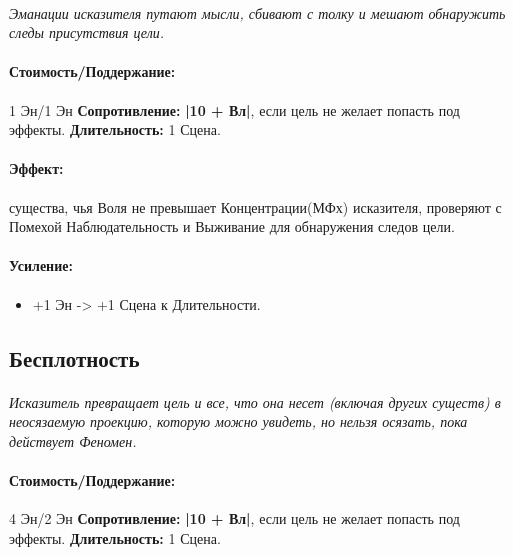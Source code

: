 \paragraph{} 
\textit{Эманации исказителя путают мысли, сбивают с толку и мешают обнаружить следы присутствия цели.}
\paragraph{Стоимость/Поддержание: }1 Эн/1 Эн
\newline
\textbf{Сопротивление: }
\textbf{|10 + Вл|}, если цель не желает попасть под эффекты.
\newline 
\textbf{Длительность: }1 Сцена.
\paragraph{Эффект: }существа, чья Воля не превышает Концентрации(МФх) исказителя, проверяют с Помехой Наблюдательность и Выживание для обнаружения следов цели.
\paragraph{Усиление:}
\begin{itemize}
\item+1 Эн -> +1 Сцена к Длительности.
\end{itemize}
\subsection{Бесплотность}
\paragraph{} 
\textit{Исказитель превращает цель и все, что она несет (включая других существ) в неосязаемую проекцию, которую можно увидеть, но нельзя осязать, пока действует Феномен.}
\paragraph{Стоимость/Поддержание: }4 Эн/2 Эн
\newline
\textbf{Сопротивление: }
\textbf{|10 + Вл|}, если цель не желает попасть под эффекты.
\newline 
\textbf{Длительность: }1 Сцена.
